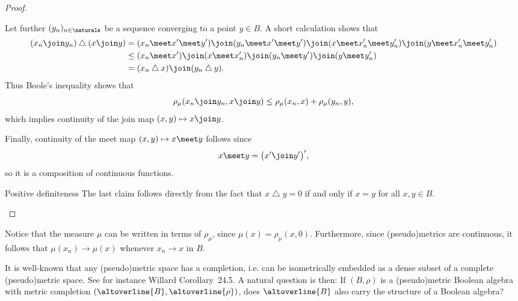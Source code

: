 \documentclass[article, a4paper, 11pt, oneside]{memoir}
\numberwithin{equation}{chapter}
\renewcommand{\symdiff}{\mathbin{\triangle}}
\begin{document}
\begin{proof}
\begin{proofsec}
    Let further $(y_n)_{n\in\naturals}$ be a sequence converging to a point $y \in B$. A short calculation shows that
    \begin{align*}
        (x_n \join y_n) \symdiff (x \join y)
            &= (x_n \meet x' \meet y') \join
               (y_n \meet x' \meet y') \join
               (x \meet x_n' \meet y_n') \join
               (y \meet x_n' \meet y_n') \\
            &\leq (x_n \meet x') \join
            (x \meet x_n') \join
            (y_n \meet y') \join
            (y \meet y_n') \\
            &= (x_n \symdiff x) \join (y_n \symdiff y).
    \end{align*}
    Thus Boole's inequality shows that
    \begin{equation}
        \label{eq:join-continuous}
        \rho_\mu(x_n \join y_n, x \join y)
            \leq \rho_\mu(x_n,x) + \rho_\mu(y_n,y),
    \end{equation}
    which implies continuity of the join map $(x,y) \mapsto x \join y$.

    Finally, continuity of the meet map $(x,y) \mapsto x \meet y$ follows since
    \begin{equation*}
        x \meet y
            = \bigl( x' \join y' \bigr)',
    \end{equation*}
    so it is a composition of continuous functions.

    \item[Positive definiteness]
    The last claim follows directly from the fact that $x \symdiff y = 0$ if and only if $x = y$ for all $x,y \in B$.
\end{proofsec}
\end{proof}

\begin{remark}
    \label{rem:convergence-of-measure}
    Notice that the measure $\mu$ can be written in terms of $\rho_\mu$, since $\mu(x) = \rho_\mu(x,0)$. Furthermore, since (pseudo)metrics are continuous, it follows that $\mu(x_n) \to \mu(x)$ whenever $x_n \to x$ in $B$.
\end{remark}


It is well-known that any (pseudo)metric space has a completion, i.e. can be isometrically embedded as a dense subset of a complete (pseudo)metric space. See for instance Willard Corollary~24.5. A natural question is then: If $(B,\rho)$ is a (pseudo)metric Boolean algebra with metric completion $(\altoverline{B}, \altoverline{\rho})$, does $\altoverline{B}$ also carry the structure of a Boolean algebra?
\end{document}
